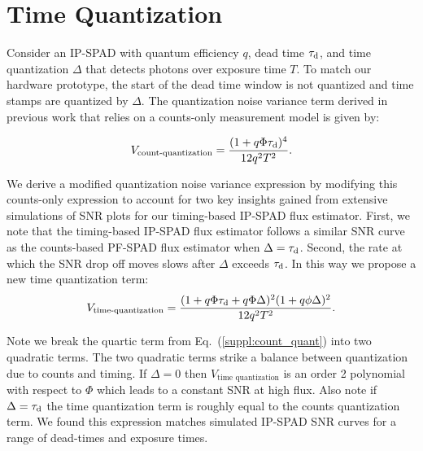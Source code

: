 \section{Time Quantization \label{suppl:quantization}}
Consider an IP-SPAD with quantum efficiency $q$, dead time $\tau_\text{d}$, and time
quantization $\Delta$ that detects photons over exposure time $T$. To match
our hardware prototype, the start of the dead time window is not quantized and
time stamps are quantized by $\Delta$. The quantization noise variance term
derived in previous work \cite{ingle2019high,Antolovic_2018} that relies on a
counts-only measurement model is given by:

\begin{equation}
V_\text{count-quantization} = \frac{(1+q\Phi \tau_\text{d})^4}{12 q^2 T^2}.\label{suppl:count_quant} 
\end{equation}

We derive a modified quantization noise variance expression by modifying this
counts-only expression to account for two key insights gained from extensive
simulations of SNR plots for our timing-based IP-SPAD flux estimator. First, we
note that the timing-based IP-SPAD flux estimator follows a similar SNR curve
as the counts-based PF-SPAD flux estimator when  $\Delta=\tau_\text{d}$. Second, the
rate at which the SNR drop off moves slows after $\Delta$ exceeds $\tau_\text{d}$. In
this way we propose a new time quantization term:
\begin{equation}
V_\text{time-quantization} = \frac{(1+q\Phi \tau_\text{d} +q\Phi \Delta)^2(1+q\phi \Delta)^2}{12 q^2 T^2}.\label{suppl:quantization_noise} 
\end{equation}

Note we break the quartic term from Eq.~(\ref{suppl:count_quant}) into two
quadratic terms. The two quadratic terms strike a balance between quantization due
to counts and timing. If $\Delta=0$ then $V_\text{time quantization}$ is an order
2 polynomial with respect to $\Phi$ which leads to a constant SNR at high flux.
Also note if $\Delta=\tau_\text{d}$ the time quantization term is roughly equal to the
counts quantization term. We found this expression matches simulated IP-SPAD
SNR curves for a range of dead-times and exposure times.

